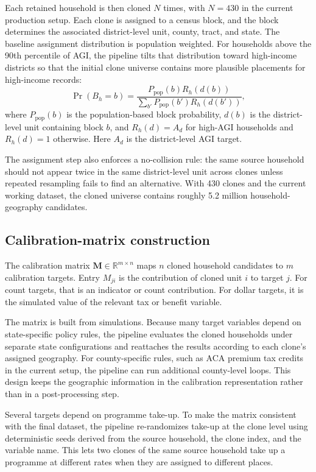 Each retained household is then cloned $N$ times, with $N = 430$ in the current production setup.
Each clone is assigned to a census block, and the block determines the associated district-level
unit, county, tract, and state. The baseline assignment distribution is population weighted. For
households above the 90th percentile of AGI, the pipeline tilts that distribution toward
high-income districts so that the initial clone universe contains more plausible placements for
high-income records:
\begin{equation}
    \Pr(B_h = b) =
    \frac{P_{\text{pop}}(b) R_h(d(b))}
    {\sum_{b'} P_{\text{pop}}(b') R_h(d(b'))},
\end{equation}
where $P_{\text{pop}}(b)$ is the population-based block probability, $d(b)$ is the district-level
unit containing block $b$, and $R_h(d) = A_d$ for high-AGI households and $R_h(d) = 1$ otherwise.
Here $A_d$ is the district-level AGI target.

The assignment step also enforces a no-collision rule: the same source household should not appear
twice in the same district-level unit across clones unless repeated resampling fails to find an
alternative. With 430 clones and the current working dataset, the cloned universe contains roughly
5.2 million household-geography candidates.

\subsection{Calibration-matrix construction}
\label{sec:matrix}

The calibration matrix $\mathbf{M} \in \mathbb{R}^{m \times n}$ maps $n$ cloned household
candidates to $m$ calibration targets. Entry $M_{ji}$ is the contribution of cloned unit $i$ to
target $j$. For count targets, that is an indicator or count contribution. For dollar targets, it
is the simulated value of the relevant tax or benefit variable.

The matrix is built from \policyengine{} simulations. Because many target variables depend on
state-specific policy rules, the pipeline evaluates the cloned households under separate state
configurations and reattaches the results according to each clone's assigned geography. For
county-specific rules, such as ACA premium tax credits in the current setup, the pipeline can run
additional county-level loops. This design keeps the geographic information in the calibration
representation rather than in a post-processing step.

Several targets depend on programme take-up. To make the matrix consistent with the final dataset,
the pipeline re-randomizes take-up at the clone level using deterministic seeds derived from the
source household, the clone index, and the variable name. This lets two clones of the same source
household take up a programme at different rates when they are assigned to different places.

